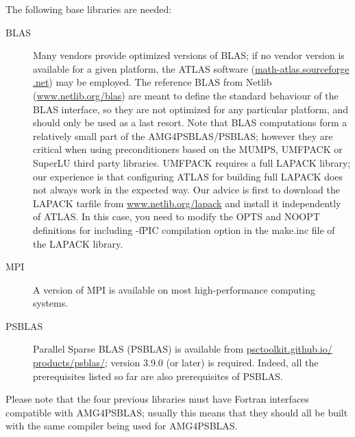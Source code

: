 The following base libraries are needed:
\begin{description}
\item[BLAS] \cite{blas3,blas2,blas1} Many vendors provide optimized versions
  of BLAS; if no vendor version is
  available for a given platform, the ATLAS software
  (\href{http://math-atlas.sourceforge.net}{math-atlas.sourceforge .net})
  may be employed.  The reference BLAS from Netlib
  (\href{http://www.netlib.org/blas}{www.netlib.org/blas}) are meant to define the standard
  behaviour of the BLAS interface, so they are not optimized for any
  particular platform, and should only be used as a last
  resort. Note that BLAS computations form a relatively small part of
  the AMG4PSBLAS/\-PSBLAS; however they are critical when using
  preconditioners based on the MUMPS, UMFPACK or SuperLU third party
  libraries. UMFPACK requires a full LAPACK library; our
experience is that configuring ATLAS for building full LAPACK does not always
work in the expected way. Our advice is first to download the LAPACK tarfile from
\href{http://www.netlib.org/lapack}{www.netlib.org/lapack} and install it independently of ATLAS. In this case,
you need to modify the OPTS and NOOPT definitions for including -fPIC compilation option
in the make.inc file of the LAPACK library.
 \item[MPI] \cite{MPI2,MPI1} A version of MPI is available on most
  high-performance computing systems.
 \item[PSBLAS] \cite{PSBLASGUIDE,psblas_00} Parallel Sparse BLAS (PSBLAS) is
  available from
  \href{https://psctoolkit.github.io/products/psblas/}{psctoolkit.github.io/
    products/psblas/}; version   3.9.0  (or later) is
  required. Indeed, all the prerequisites   listed so far are also
  prerequisites of PSBLAS. 
\end{description}
Please note that the four previous libraries must have Fortran
interfaces compatible with AMG4PSBLAS; usually this means that they
should all be built with the same compiler being used for  AMG4PSBLAS.

